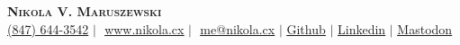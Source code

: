 \begin{center}
  \textbf{\Huge \scshape Nikola V. Maruszewski} \\
  \vspace{3pt}%
  \small%
  \faPhone* \href{tel:(847) 644-3542}{(847) 644-3542}
  $|$ \faGlobe\,\,\href{https://www.nikola.cx}{\underline{www.nikola.cx}}
  $|$ \faEnvelope\,\,\href{mailto:me@nikola.cx}{\underline{me@nikola.cx}}
  $|$  \href{https://github.com/egelja}{\underline{Github}}
  $|$  \href{https://www.linkedin.com/in/nikola-maruszewski/}{\underline{Linkedin}}
  $|$  \href{https://discuss.systems/@nikola}{\underline{Mastodon}}
\end{center}
\vspace{-18pt}